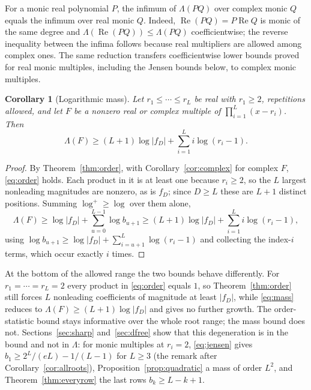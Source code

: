 \documentclass[11pt]{article}
\newtheorem{corollary}[theorem]{Corollary}
\begin{document}
For a monic real polynomial $P$, the infimum of $\Lambda(PQ)$ over complex
monic $Q$ equals the infimum over real monic $Q$.  Indeed,
$\operatorname{Re}(PQ)=P\operatorname{Re}Q$ is monic of the same degree and
$\Lambda(\operatorname{Re}(PQ))\le\Lambda(PQ)$ coefficientwise; the reverse
inequality between the infima follows because real multipliers are allowed
among complex ones.  The same reduction transfers coefficientwise lower
bounds proved for real monic multiples, including the Jensen bounds below,
to complex monic multiples.

\begin{corollary}[Logarithmic mass]\label{cor:mass}
Let $r_1\le\cdots\le r_L$ be real with $r_1\ge2$, repetitions allowed, and
let $F$ be a nonzero real or complex multiple of $\prod_{i=1}^L(x-r_i)$.  Then
\begin{equation}\label{eq:mass}
 \Lambda(F)\ge(L+1)\log|f_D|+\sum_{i=1}^{L}i\log(r_i-1).
\end{equation}
\end{corollary}

\begin{proof}
By Theorem~\ref{thm:order}, with Corollary~\ref{cor:complex} for complex
$F$, \eqref{eq:order} holds.  Each product in it is at least one because $r_i\ge2$, so the
$L$ largest nonleading magnitudes are nonzero, as is $f_D$; since $D\ge L$
these are $L+1$ distinct positions.  Summing $\log^+\ge\log$ over them alone,
\[
 \Lambda(F)\ge\log|f_D|+\sum_{u=0}^{L-1}\log b_{u+1}
 \ge(L+1)\log|f_D|+\sum_{i=1}^{L}i\log(r_i-1),
\]
using $\log b_{u+1}\ge\log|f_D|+\sum_{i=u+1}^L\log(r_i-1)$ and collecting the
index-$i$ terms, which occur exactly $i$ times.
\end{proof}

At the bottom of the allowed range the two bounds behave differently.  For
$r_1=\cdots=r_L=2$ every product in \eqref{eq:order} equals $1$, so
Theorem~\ref{thm:order} still forces $L$ nonleading coefficients of
magnitude at least $|f_D|$, while \eqref{eq:mass} reduces to
$\Lambda(F)\ge(L+1)\log|f_D|$ and gives no further growth.  The order-statistic
bound stays informative over the whole root range; the mass bound does not.
Sections~\ref{sec:sharp} and~\ref{sec:dfree} show that this degeneration is in
the bound and not in $\Lambda$: for monic multiples at $r_i=2$,
\eqref{eq:jensen} gives $b_1\ge2^L/(eL)-1/(L-1)$ for $L\ge3$ (the remark
after Corollary~\ref{cor:allroots}), Proposition~\ref{prop:quadratic} a
mass of order $L^2$, and Theorem~\ref{thm:everyrow} the last rows
$b_k\ge L-k+1$.
\end{document}

